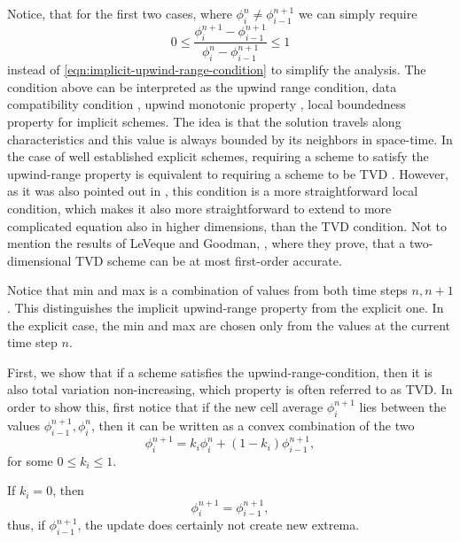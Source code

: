 \documentclass[../thesis.tex]{subfiles}
\begin{document}
Notice, that for the first two cases, where \(\phi_{i}^{n} \neq \phi_{i-1}^{n+1}\) we can simply require
\begin{equation}\label{eqn:upwind-range-simpler}
    0
    \leq
    \frac{\phi_{i}^{n+1} - \phi_{i-1}^{n+1}}{\phi_{i}^{n} - \phi_{i-1}^{n+1}}
    \leq
    1
\end{equation}
instead of \eqref{eqn:implicit-upwind-range-condition} to simplify the analysis.
The condition above can be interpreted as the upwind range condition\cite{1998_Laney_BOOK},
data compatibility condition \cite{2009_Toro_BOOK}, upwind monotonic property \cite{1989_Huynh_CONF}, local boundedness property \cite{1982_Roe,1997_Thuburn} for implicit schemes.
The idea is that the solution travels along characteristics and this value is always bounded by its neighbors in space-time. In the case of well established explicit schemes, requiring a scheme to satisfy the upwind-range property is equivalent to requiring a scheme to be TVD \cite{1997_Thuburn}. However, as it was also pointed out in \cite{1997_Thuburn}, this condition is a more straightforward local condition, which makes it also more straightforward to extend to more complicated equation also in higher dimensions, than the TVD condition. Not to mention the results of LeVeque and Goodman, \cite{1985_LeVeque_CONF}, where they prove, that a two-dimensional TVD scheme can be at most first-order accurate.

Notice that min and max is a combination of values from both time steps \(n, n+1\).
This distinguishes the implicit upwind-range property from the explicit one.
In the explicit case, the min and max are chosen only from the values at the current time step \(n\).

First, we show that if a scheme satisfies the upwind-range-condition, then it is also total variation non-increasing, which property is often referred to as TVD.
In order to show this, first notice that if the new cell average \(\phi_{i}^{n+1}\) lies
between the values \(\phi_{i-1}^{n+1}, \phi_{i}^{n}\), then it can be written as a convex combination of the two
\begin{equation}\label{eqn:convex-combination}
    \phi_{i}^{n+1} =
    k_{i}\phi_{i}^{n} + (1-k_{i})\phi_{i-1}^{n+1},
\end{equation}
for some \(0 \leq k_{i} \leq 1\).

If \(k_{i} = 0\), then
\[
    \phi_{i}^{n+1} = \phi_{i-1}^{n+1},
\]
thus, if \(\phi_{i-1}^{n+1}\), the update does certainly not create new extrema.
\end{document}
